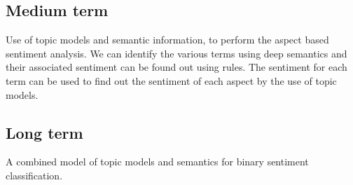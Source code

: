 \subsection{Medium term}
Use of topic models and semantic information, to perform the aspect based sentiment analysis. We can identify the various terms using deep semantics and their 
associated sentiment can be found out using rules. The sentiment for each term can be used to find out the sentiment of each aspect by the use of topic models.

\subsection{Long term}
A combined model of topic models and semantics for binary sentiment classification.

% 
